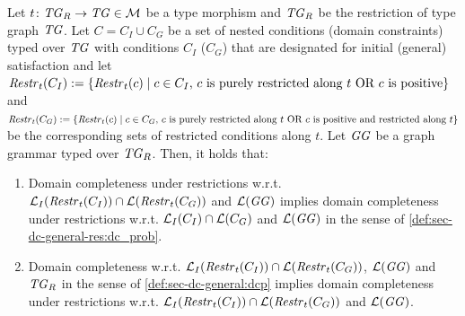 \begin{theorem}
\label{thm:sec-dc-general-res:dom_compl_res}
Let $t\colon \mathit{TG}_R \to \mathit{TG} \in {\cal M}$ be a type morphism and $\mathit{TG}_R$ be the restriction of type graph $\mathit{TG}$.
Let $C=C_I \cup C_G$ be a set of nested conditions (domain constraints) typed over $\mathit{TG}$ with conditions $C_I$ ($C_G$) that are designated for initial (general) satisfaction and let $\mathit{Restr}_t(C_I):=\{\mathit{Restr}_t(c) \mid c \in C_I \text{, } c \text{ is purely restricted along }t \text{ OR } c \text{ is positive}\}$ and $\mathit{Restr}_t(C_G):=\{\mathit{Restr}_t(c) \mid c \in C_G \text{, } c \text{ is purely restricted along }t \text{ OR } c \text{ is positive and restricted along }t\}$ be the corresponding sets of restricted conditions along $t$.
Let $\mathit{GG}$ be a graph grammar typed over $\mathit{TG}_R$.
Then, it holds that:
\begin{enumerate}
  \item \label{thm:sec-dc-general-res:dom_compl_res:item1} Domain completeness under restrictions w.r.t. $\mathcal{L}_I(\mathit{Restr}_t(C_I)) \cap \mathcal{L}(\mathit{Restr}_t(C_G))$ and $\mathcal{L}(\mathit{GG})$ implies domain completeness under restrictions w.r.t. $\mathcal{L}_I(C_I) \cap \mathcal{L}(C_G)$ and $\mathcal{L}(\mathit{GG})$ in the sense of \cref{def:sec-dc-general-res:dc_prob}.
  \item \label{thm:sec-dc-general-res:dom_compl_res:item2} Domain completeness w.r.t. $\mathcal{L}_I(\mathit{Restr}_t(C_I)) \cap \mathcal{L}(\mathit{Restr}_t(C_G))$, $\mathcal{L}(\mathit{GG})$ and $\mathit{TG}_R$ in the sense of \cref{def:sec-dc-general:dcp} implies domain completeness under restrictions w.r.t. $\mathcal{L}_I(\mathit{Restr}_t(C_I)) \cap \mathcal{L}(\mathit{Restr}_t(C_G))$ and $\mathcal{L}(\mathit{GG})$.
  \envEndMarker
\end{enumerate}
\end{theorem}

